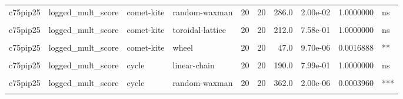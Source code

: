 \documentclass[
]{book}
\begin{document}
\begin{table}
\begin{tabular}{l|l|l|l|r|r|r|r|r|l}
\hline
\cellcolor{gray!6}{c75pip25} & \cellcolor{gray!6}{logged\_mult\_score} & \cellcolor{gray!6}{comet-kite} & \cellcolor{gray!6}{random-barabasi-albert} & \cellcolor{gray!6}{20} & \cellcolor{gray!6}{20} & \cellcolor{gray!6}{393.0} & \cellcolor{gray!6}{0.00e+00} & \cellcolor{gray!6}{0.0000002} & \cellcolor{gray!6}{****}\\
\hline
c75pip25 & logged\_mult\_score & comet-kite & random-waxman & 20 & 20 & 286.0 & 2.00e-02 & 1.0000000 & ns\\
\hline
\cellcolor{gray!6}{c75pip25} & \cellcolor{gray!6}{logged\_mult\_score} & \cellcolor{gray!6}{comet-kite} & \cellcolor{gray!6}{star} & \cellcolor{gray!6}{20} & \cellcolor{gray!6}{20} & \cellcolor{gray!6}{208.0} & \cellcolor{gray!6}{8.41e-01} & \cellcolor{gray!6}{1.0000000} & \cellcolor{gray!6}{ns}\\
\hline
c75pip25 & logged\_mult\_score & comet-kite & toroidal-lattice & 20 & 20 & 212.0 & 7.58e-01 & 1.0000000 & ns\\
\hline
\cellcolor{gray!6}{c75pip25} & \cellcolor{gray!6}{logged\_mult\_score} & \cellcolor{gray!6}{comet-kite} & \cellcolor{gray!6}{well-mixed} & \cellcolor{gray!6}{20} & \cellcolor{gray!6}{20} & \cellcolor{gray!6}{397.0} & \cellcolor{gray!6}{0.00e+00} & \cellcolor{gray!6}{0.0000000} & \cellcolor{gray!6}{****}\\
\hline
c75pip25 & logged\_mult\_score & comet-kite & wheel & 20 & 20 & 47.0 & 9.70e-06 & 0.0016888 & **\\
\hline
\cellcolor{gray!6}{c75pip25} & \cellcolor{gray!6}{logged\_mult\_score} & \cellcolor{gray!6}{comet-kite} & \cellcolor{gray!6}{windmill} & \cellcolor{gray!6}{20} & \cellcolor{gray!6}{20} & \cellcolor{gray!6}{367.0} & \cellcolor{gray!6}{8.00e-07} & \cellcolor{gray!6}{0.0001597} & \cellcolor{gray!6}{***}\\
\hline
c75pip25 & logged\_mult\_score & cycle & linear-chain & 20 & 20 & 190.0 & 7.99e-01 & 1.0000000 & ns\\
\hline
\cellcolor{gray!6}{c75pip25} & \cellcolor{gray!6}{logged\_mult\_score} & \cellcolor{gray!6}{cycle} & \cellcolor{gray!6}{random-barabasi-albert} & \cellcolor{gray!6}{20} & \cellcolor{gray!6}{20} & \cellcolor{gray!6}{400.0} & \cellcolor{gray!6}{0.00e+00} & \cellcolor{gray!6}{0.0000000} & \cellcolor{gray!6}{****}\\
\hline
c75pip25 & logged\_mult\_score & cycle & random-waxman & 20 & 20 & 362.0 & 2.00e-06 & 0.0003960 & ***\\
\hline
\cellcolor{gray!6}{c75pip25} & \cellcolor{gray!6}{logged\_mult\_score} & \cellcolor{gray!6}{cycle} & \cellcolor{gray!6}{star} & \cellcolor{gray!6}{20} & \cellcolor{gray!6}{20} & \cellcolor{gray!6}{314.0} & \cellcolor{gray!6}{2.00e-03} & \cellcolor{gray!6}{0.2760000} & \cellcolor{gray!6}{ns}\\

\end{tabular}
\end{table}
\end{document}
